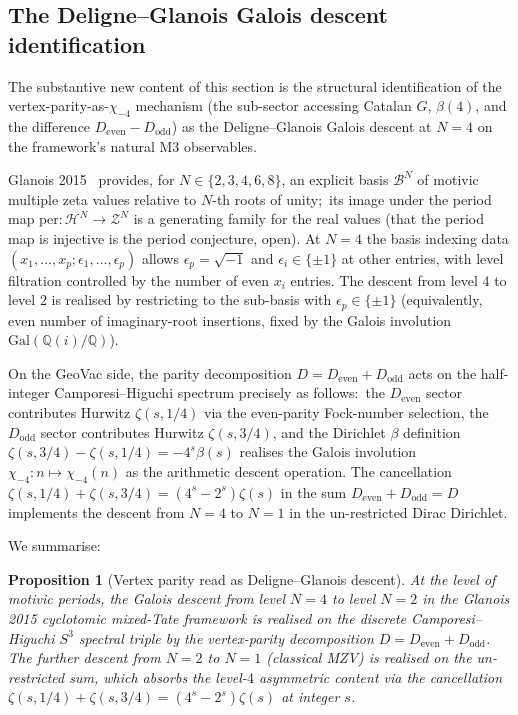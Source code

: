 \documentclass[11pt,a4paper]{article}
\theoremstyle{plain}
\newtheorem{proposition}[theorem]{Proposition}
\theoremstyle{definition}
\newcommand{\sthree}{S^{3}}
\newcommand{\Q}{\mathbb{Q}}
\newcommand{\Hcal}{\mathcal{H}}
\newcommand{\Bcal}{\mathcal{B}}
\newcommand{\Zcal}{\mathcal{Z}}
\begin{document}
\subsection{The Deligne--Glanois Galois descent identification}
\label{subsec:m3_galois_descent}

The substantive new content of this section is the structural
identification of the vertex-parity-as-$\chi_{-4}$ mechanism (the
sub-sector accessing Catalan $G$, $\beta(4)$, and the difference
$D_{\mathrm{even}} - D_{\mathrm{odd}}$) as the Deligne--Glanois Galois
descent at $N = 4$ on the framework's natural M3 observables.

Glanois 2015~\cite{glanois2015} provides, for
$N \in \{2, 3, 4, 6, 8\}$, an explicit basis $\Bcal^N$ of motivic
multiple zeta values relative to $N$-th roots of unity;\ its image
under the period map $\mathrm{per}: \Hcal^N \to \Zcal^N$ is a
generating family for the real values (that the period map is
injective is the period conjecture, open).  At $N = 4$ the basis indexing data
$(x_1, \ldots, x_p; \epsilon_1, \ldots, \epsilon_p)$ allows
$\epsilon_p = \sqrt{-1}$ and $\epsilon_i \in \{\pm 1\}$ at other
entries, with level filtration controlled by the number of even
$x_i$ entries.  The descent from level $4$ to level $2$ is realised
by restricting to the sub-basis with $\epsilon_p \in \{\pm 1\}$
(equivalently, even number of imaginary-root insertions, fixed by
the Galois involution $\mathrm{Gal}(\Q(i)/\Q)$).

On the GeoVac side, the parity decomposition
$D = D_{\mathrm{even}} + D_{\mathrm{odd}}$ acts on the half-integer
Camporesi--Higuchi spectrum precisely as follows:\ the
$D_{\mathrm{even}}$ sector contributes Hurwitz $\zeta(s, 1/4)$ via the
even-parity Fock-number selection, the $D_{\mathrm{odd}}$ sector
contributes Hurwitz $\zeta(s, 3/4)$, and the Dirichlet $\beta$
definition $\zeta(s, 3/4) - \zeta(s, 1/4) = -4^s \beta(s)$ realises
the Galois involution $\chi_{-4}: n \mapsto \chi_{-4}(n)$ as the
arithmetic descent operation.  The cancellation $\zeta(s, 1/4) +
\zeta(s, 3/4) = (4^s - 2^s)\zeta(s)$ in the sum
$D_{\mathrm{even}} + D_{\mathrm{odd}} = D$ implements the descent
from $N = 4$ to $N = 1$ in the un-restricted Dirac Dirichlet.

We summarise:

\begin{proposition}[Vertex parity read as Deligne--Glanois descent]
\label{prop:vertex_parity_descent}
At the level of motivic periods, the Galois descent from level $N = 4$ to
level $N = 2$ in the Glanois 2015 cyclotomic mixed-Tate framework is realised on the
discrete Camporesi--Higuchi $\sthree$ spectral triple by the
vertex-parity decomposition $D = D_{\mathrm{even}} + D_{\mathrm{odd}}$.
The further descent from $N = 2$ to $N = 1$ (classical MZV) is
realised on the un-restricted sum, which absorbs the level-$4$
asymmetric content via the cancellation
$\zeta(s, 1/4) + \zeta(s, 3/4) = (4^s - 2^s)\zeta(s)$ at integer $s$.
\end{proposition}
\end{document}
